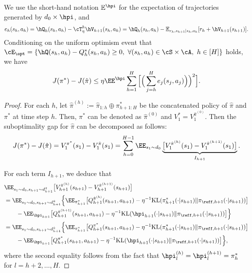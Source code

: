 \documentclass[11pt]{article}
\newcommand{\E}{\mathbb E}
\newcommand{\KL}{\mathrm{KL}}
\begin{document}
\begin{lemma}\label{lm:value decompose_mdp_restate}
We use the short-hand notation $\E^{\hpi}$ for the expectation of trajectories generated by $d_0\times\hpi$, and 
$$
e_h(s_h,a_h) = \hQ_h(s_h,a_h)-\cT_\eta^h \hV_{h+1}(s_h,a_h) = \hQ_h(s_h,a_h) - \E_{r_h,s_{h+1}|s_h,a_h}[r_h + \hV_{h+1}(s_{h+1})].
$$
Conditioning on the uniform optimism event that $\cE_{\opt}=\{\hQ(s_h,a_h)-Q^*_h(s_h,a_h) \ge 0,~\forall(s_h,a_h)\in\cS\times\cA,~h\in[H]\}$ holds, we have
    $$
    J(\pi^*) - J(\hat \pi) \le \eta \EE^{\hpi} \sum_{h = 1}^H \Big[\Big(\sum_{j=h}^H e_j(s_j,a_j) \Big)\Big)^2\Big].
    $$
\end{lemma}
\begin{proof}
For each $h$, let $\hat \pi^{(h)} := \hat \pi_{1:h} \oplus \pi^*_{h+1:H}$ be the concatenated policy of $\hat \pi$ and $\pi^*$ at time step $h$. Then, $\pi^*$ can be denoted as $\hat\pi^{(0)}$ and $V_1^*=V_1^{\hat\pi^{(0)}}$. %
Then the suboptimality gap for $\hat \pi$ can be decomposed as follows: 
\begin{align*} 
    J(\pi^*) - J(\hat \pi) = V_1^{\pi^*}(s_1) -  V_1^{\hat \pi}(s_1)= \sum_{h = 0}^{H - 1} \EE_{s_1 \sim d_0} \underbrace{\bigl[V_1^{\hat \pi^{(h)}}(s_1) - V_1^{\hat \pi^{(h + 1)}}(s_1)\bigr]}_{I_{h + 1}}.
\end{align*}

For each term $I_{h+1}$, we deduce that
\begin{align*}
    &\EE_{s_1 \sim d_0, s_{h + 1} \sim d_{h + 1}^{\hat\pi}} \bigl[V_{h + 1}^{\hat \pi^{(h)}}(s_{h + 1}) - V_{h + 1}^{\hat \pi^{(h + 1)}}(s_{h + 1})\bigr]\\
    &= \EE_{s_1 \sim d_0, s_{h + 1} \sim d_{h + 1}^{\hat\pi}}\Big\{ \EE_{\pi^*_{h+1}}\bigl[Q_{h + 1}^{\hat \pi^{(h)}}(s_{h + 1},a_{h+1}) - \eta^{-1}\KL(\pi_{h+1}^*(\cdot|s_{h+1})\| \pi_{\reff,h+1}(\cdot|s_{h+1}))\bigr]\\
    &\qquad - \EE_{\hpi_{h+1}}\bigl[Q_{h + 1}^{\hat \pi^{(h+1)}}(s_{h + 1},a_{h+1}) - \eta^{-1}\KL(\hpi_{h+1}(\cdot|s_{h+1})\| \pi_{\reff,h+1}(\cdot|s_{h+1}))\bigr]\Big\}\\
    &= \EE_{s_1 \sim d_0, s_{h + 1} \sim d_{h + 1}^{\hat\pi}}\Big\{ \EE_{\pi^*_{h+1}}\bigl[Q_{h + 1}^{\pi^*}(s_{h + 1},a_{h+1}) - \eta^{-1}\KL(\pi_{h+1}^*(\cdot|s_{h+1})\| \pi_{\reff,h+1}(\cdot|s_{h+1}))\bigr]\\
    &\qquad - \EE_{\hpi_{h+1}}\bigl[Q_{h + 1}^{\pi^*}(s_{h + 1},a_{h+1}) - \eta^{-1}\KL(\hpi_{h+1}(\cdot|s_{h+1})\| \pi_{\reff,h+1}(\cdot|s_{h+1}))\bigr]\Big\},
\end{align*}
where the second equality follows from the fact that $\hpi^{(h)}_l=\hpi^{(h+1)}_l=\pi_h^*$ for $l=h+2,\ldots,H$.


\end{proof}
\end{document}
